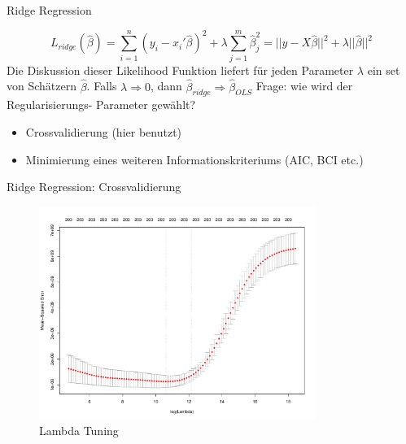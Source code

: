 \documentclass[10pt]{beamer}
\begin{document}
\begin{frame}{Ridge Regression}
	
    \begin{equation*}
        L_{ridge}(\hat{\beta})=\sum_{i=1}^{n}(y_{i}-x_{i}'\hat{\beta})^2+\lambda\sum_{j=1}^{m}\hat{\beta}_{j}^2=||y-X\hat{\beta}||^2+\lambda||\hat{\beta}||^2
    \end{equation*}
    Die Diskussion dieser Likelihood Funktion liefert für jeden Parameter $\lambda$ ein set von Schätzern $\hat{\beta}$.
    Falls $\lambda \Rightarrow 0$, dann $\hat{\beta}_{ridge} \Rightarrow \hat{\beta}_{OLS}$
    Frage: wie wird der Regularisierungs- Parameter gewählt?
    \begin{itemize}
        \item Crossvalidierung (hier benutzt)
        \item Minimierung eines weiteren Informationskriteriums (AIC, BCI etc.)
    \end{itemize}
    
\end{frame}

\begin{frame}{Ridge Regression: Crossvalidierung}

    \begin{figure}
        \centering
        \includegraphics[width=0.8\textwidth, keepaspectratio]{figures/ridge_tuning.pdf}
        \caption{Lambda Tuning}
    \end{figure}
    
\end{frame}
\end{document}
